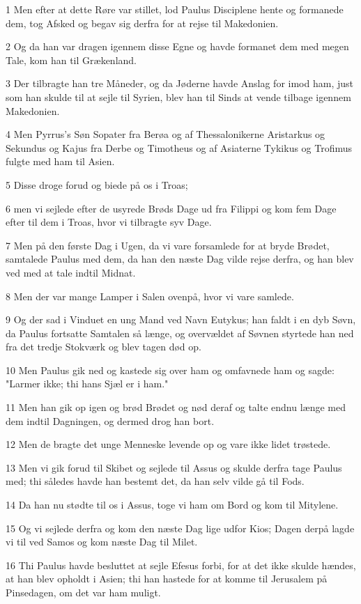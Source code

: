 \par 1 Men efter at dette Røre var stillet, lod Paulus Disciplene hente og formanede dem, tog Afsked og begav sig derfra for at rejse til Makedonien.
\par 2 Og da han var dragen igennem disse Egne og havde formanet dem med megen Tale, kom han til Grækenland.
\par 3 Der tilbragte han tre Måneder, og da Jøderne havde Anslag for imod ham, just som han skulde til at sejle til Syrien, blev han til Sinds at vende tilbage igennem Makedonien.
\par 4 Men Pyrrus's Søn Sopater fra Berøa og af Thessalonikerne Aristarkus og Sekundus og Kajus fra Derbe og Timotheus og af Asiaterne Tykikus og Trofimus fulgte med ham til Asien.
\par 5 Disse droge forud og biede på os i Troas;
\par 6 men vi sejlede efter de usyrede Brøds Dage ud fra Filippi og kom fem Dage efter til dem i Troas, hvor vi tilbragte syv Dage.
\par 7 Men på den første Dag i Ugen, da vi vare forsamlede for at bryde Brødet, samtalede Paulus med dem, da han den næste Dag vilde rejse derfra, og han blev ved med at tale indtil Midnat.
\par 8 Men der var mange Lamper i Salen ovenpå, hvor vi vare samlede.
\par 9 Og der sad i Vinduet en ung Mand ved Navn Eutykus; han faldt i en dyb Søvn, da Paulus fortsatte Samtalen så længe, og overvældet af Søvnen styrtede han ned fra det tredje Stokværk og blev tagen død op.
\par 10 Men Paulus gik ned og kastede sig over ham og omfavnede ham og sagde: "Larmer ikke; thi hans Sjæl er i ham."
\par 11 Men han gik op igen og brød Brødet og nød deraf og talte endnu længe med dem indtil Dagningen, og dermed drog han bort.
\par 12 Men de bragte det unge Menneske levende op og vare ikke lidet trøstede.
\par 13 Men vi gik forud til Skibet og sejlede til Assus og skulde derfra tage Paulus med; thi således havde han bestemt det, da han selv vilde gå til Fods.
\par 14 Da han nu stødte til os i Assus, toge vi ham om Bord og kom til Mitylene.
\par 15 Og vi sejlede derfra og kom den næste Dag lige udfor Kios; Dagen derpå lagde vi til ved Samos og kom næste Dag til Milet.
\par 16 Thi Paulus havde besluttet at sejle Efesus forbi, for at det ikke skulde hændes, at han blev opholdt i Asien; thi han hastede for at komme til Jerusalem på Pinsedagen, om det var ham muligt.
